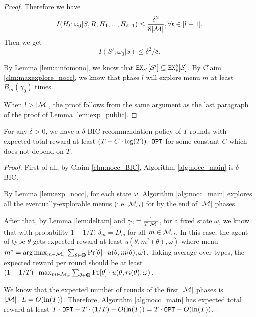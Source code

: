 \begin{proof}
Therefore we have
\[
I(H_t; \omega_0|S,R,H_1,...,H_{t-1}) \leq \frac{\delta^2}{8|\mathcal{M}|}, \forall t \in [l-1].
\]
Then we get
\[
I(S'; \omega_0 | S) \leq \delta^2/8.
\]

By Lemma \ref{lem:ainfomono}, we know that $\mathtt{EX}_{s'}[\mathcal{S}'] \subseteq \mathtt{EX}^{\delta}_s[\mathcal{S}]$. By Claim \ref{clm:maxexplore_nocc}, we know that phase $l$ will explore menu $m$ at least $B_m(\gamma_0)$ times.

When $l > |\mathcal{M}|$, the proof follows from the same argument as the last paragraph of the proof of Lemma \ref{lem:exp_public}.
\end{proof}

\begin{corollary}
\label{cor:private_nocc}
For any $\delta > 0$, we have a $\delta$-BIC recommendation policy of $T$ rounds with expected total reward at least $\left(T - C\cdot \log(T) \right) \cdot \mathtt{OPT}$ for some constant $C$ which does not depend on $T$.
\end{corollary}

\begin{proof}

First of all, by Claim \ref{clm:nocc_BIC}, Algorithm \ref{alg:nocc_main} is $\delta$-BIC.

By Lemma \ref{lem:exp_nocc}, for each state $\omega$, Algorithm \ref{alg:nocc_main} explores all the eventually-explorable menus (i.e. $\mathcal{M}_{\omega}$) for by the end of $|\mathcal{M}|$ phases.

After that, by Lemma \ref{lem:deltam} and $\gamma_2 = \frac{1}{T|\mathcal{M}|}$, for a fixed state $\omega$, we know that with probability $1- 1/T$, $\delta_m = D_m$ for all $m \in \mathcal{M}_{\omega}$. In this case, the agent of type $\theta$ gets expected reward at least $u(\theta,m^*(\theta),\omega)$ where menu $m^* =\arg\max_{m \in \mathcal{M}_{\omega}} \sum_{\theta \in \bold{\Theta}} \Pr[\theta] \cdot u(\theta, m(\theta), \omega)$. Taking average over types, the expected reward per round should be at least $(1-1/T) \cdot \max_{m \in \mathcal{M}_{\omega}} \sum_{\theta \in \bold{\Theta}} \Pr[\theta] \cdot u(\theta, m(\theta), \omega)$.

We know that the expected number of rounds of the first $|\mathcal{M}|$ phases is $|\mathcal{M}| \cdot L = O(\ln(T))$. Therefore, Algorithm \ref{alg:nocc_main} has expected total reward at least $T \cdot \mathtt{OPT}- T \cdot (1/T) - O(\ln(T)) = T\cdot \mathtt{OPT} - O(\ln(T))$.

\end{proof}

